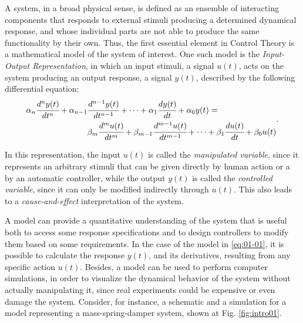 \documentclass[a4paper,11pt]{book}
\numberwithin{figure}{chapter}
\numberwithin{equation}{chapter}
\numberwithin{table}{chapter}
\theoremstyle{definition}
\begin{document}
A system, in a broad physical sense, is defined as an ensemble of interacting components that responds to external stimuli producing a determined dynamical response, and whose individual parts are not able to produce the same functionality by their own. Thus, the first essential element in Control Theory is a mathematical model of the system of interest. One such model is the \textit{Input-Output Representation}, in which an input stimuli, a signal $u(t)$, acts on the system producing an output response, a signal $y(t)$, described by the following differential equation:
\begin{equation} \label{eq:01-01}
\begin{split}
    \alpha_n \cfrac{d^n y(t)}{dt^n} + \alpha_{n-1} & \cfrac{d^{n-1} y(t)}{dt^{n-1}} + \cdots + \alpha_{1} \cfrac{d y(t)}{dt} + \alpha_{0} y(t) = \\
    & \beta_m \cfrac{d^m u(t)}{dt^m} + \beta_{m-1} \cfrac{d^{m-1} u(t)}{dt^{m-1}} + \cdots + \beta_{1} \cfrac{d u(t)}{dt} + \beta_{0} u(t)
\end{split}
.\end{equation}

In this representation, the input $u(t)$ is called the \textit{manipulated variable}, since it represents an arbitrary stimuli that can be given directly by human action or a by an automatic controller, while the output $y(t)$ is called the \textit{controlled variable}, since it can only be modified indirectly through $u(t)$. This also leads to a \textit{cause-and-effect} interpretation of the system.

A model can provide a quantitative understanding of the system that is useful both to access some response specifications and to design controllers to modify them based on some requirements. In the case of the model in \eqref{eq:01-01}, it is possible to calculate the response $y(t)$, and its derivatives, resulting from any specific action $u(t)$. Besides, a model can be used to perform computer simulations, in order to visualize the dynamical behavior of the system without actually manipulating it, since real experiments could be expensive or even damage the system. Consider, for instance, a schematic and a simulation for a model representing a mass-spring-damper system, shown at Fig. \ref{fig:intro01}.
\end{document}
